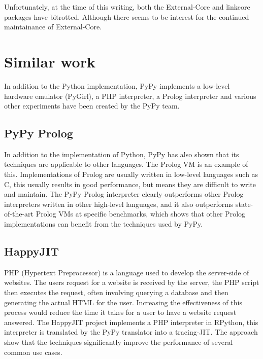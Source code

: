 Unfortunately, at the time of this writing, both the External-Core and linkcore 
packages have bitrotted. Although there seems to be interest for the continued 
maintainance of External-Core.

\section{Similar work}

In addition to the Python implementation, PyPy implements a low-level 
hardware emulator (PyGirl), a PHP interpreter, a Prolog interpreter and various 
other experiments have been created by the PyPy team. 

\subsection{PyPy Prolog}

In addition to the implementation of Python, PyPy has also shown that its techniques
are applicable to other languages. The Prolog VM is an example of this. Implementations
of Prolog are usually written in low-level languages such as C, this usually results in
good performance, but means they are difficult to write and maintain. The PyPy Prolog 
interpreter clearly outperforms other Prolog interpreters written in other high-level
languages, and it also outperforms state-of-the-art Prolog VMs at specific benchmarks,
which shows that other Prolog implementations can benefit from the techniques used by
PyPy. \cite{bolz2010towards}

\subsection{HappyJIT}

PHP (Hypertext Preprocessor) is a language used to develop the server-side of 
websites. The users request for a website is received by the server, the PHP script
then executes the request, often involving querying a database and then generating 
the actual HTML for the user. Increasing the effectiveness of this process would
reduce the time it takes for a user to have a website request answered. 
The HappyJIT project implements a PHP interpreter in RPython, this interpreter is 
translated by the PyPy translator into a tracing-JIT. The approach show that 
the techniques significantly improve the performance of several common use cases.
\cite{homescu2011happyjit}

